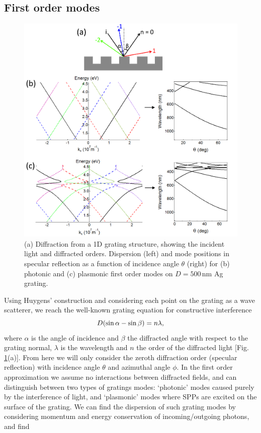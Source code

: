 \subsection{First order modes}
\begin{figure}[h!] 
\centering    
\includegraphics[width=\textwidth]{Fig3}
\caption{(a) Diffraction from a 1D grating structure, showing the incident light and diffracted orders. Dispersion (left) and mode positions in specular reflection as a function of incidence angle $\theta$ (right) for (b) photonic and (c) plasmonic first order modes on $D=500$\,nm Ag grating.}
\label{3Fig3}
\end{figure}
Using Huygens' construction and considering each point on the grating as a wave scatterer, we reach the well-known grating equation for constructive interference
\begin{equation}
\centering
D(\sin\alpha-\sin\beta) = n\lambda ,
\label{GratingEq}
\end{equation}
where $\alpha$ is the angle of incidence and $\beta$ the diffracted angle with respect to the grating normal, $\lambda$ is the wavelength and $n$ the order of the diffracted light [Fig.\,\ref{3Fig3}(a)]. From here we will only consider the zeroth diffraction order (specular reflection) with incidence angle $\theta$ and azimuthal angle $\phi$. In the first order approximation we assume no interactions between diffracted fields, and can distinguish between two types of gratings modes: `photonic' modes caused purely by the interference of light, and `plasmonic' modes where SPPs are excited on the surface of the grating. We can find the dispersion of such grating modes by considering momentum and energy conservation of incoming/outgoing photons, and find
